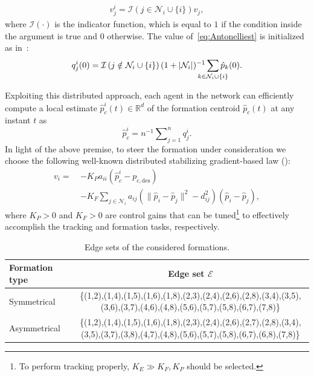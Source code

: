 \documentclass{ifac/ifacconf}
\begin{document}
\begin{align}
    v^i_j = \mathcal{I}\left(j\in \mathcal{N}_i \cup \{i\}\right)v_j,
\end{align}
where $\mathcal{I}(\cdot)$ is the indicator function, which is equal to $1$ if the condition inside the argument is true and $0$ otherwise. The value of~\eqref{eq:Antonelliest} is initialized as in~\cite{FABRIS2024OIFT}:
\begin{align}
    q^i_j(0) = \mathcal{I}\left(j \notin \mathcal{N}_i \cup \{i\}\right)
        (1+|\mathcal{N}_{i}|)^{-1} \sum_{\mathclap{k \in \mathcal{N}_i \cup \{i\}}} \hat{p}_k(0).
\end{align}

Exploiting this distributed approach, each agent in the network can efficiently compute a local estimate $\hat{p}^i_c(t)\in \mathbb{R}^d$ of the formation centroid $\hat{p}_c(t)$ at any instant $t$ as
\begin{equation}
    \hat{p}^i_c = n^{-1} \sum\nolimits_{j=1}^n q^i_j.
\end{equation}
In light of the above premise, to steer the formation under consideration we choose the following well-known distributed stabilizing gradient-based law (\cite{ahn2020formation}):
\begin{align}
    v_i =~ & -K_P a_{ii}(\hat{p}_c^i-p_{c,\text{des}}) \nonumber\\
    & -K_F  \sum_{j\in \mathcal{N}_i}a_{ij} (\|\hat{p}_i-\hat{p}_j\|^2 - d_{ij}^2)(\hat{p}_i-\hat{p}_j),
\end{align}
where $K_P>0$ and $K_F>0$ are control gains that can be tuned\footnote{To perform tracking properly, $K_E \gg K_F,K_P$ should be selected.} to effectively accomplish the tracking and formation tasks, respectively. 


\begin{table}[h]
	\captionsetup{font=small, width=\textwidth}
	\caption{Edge sets of the considered formations.}
	\label{tab:edgesets}
    \scriptsize 
    \centering
	\begin{tabular}{lc}
		\toprule
		Formation type & Edge set $\mathcal{E}$ \\
		\midrule
        Symmetrical & \{(1,2),(1,4),(1,5),(1,6),(1,8),(2,3),(2,4),(2,6),(2,8),(3,4),(3,5),(3,6),(3,7),(4,6),(4,8),(5,6),(5,7),(5,8),(6,7),(7,8)\}\\
        Asymmetrical & \{(1,2),(1,4),(1,5),(1,6),(1,8),(2,3),(2,4),(2,6),(2,7),(2,8),(3,4),(3,5),(3,7),(3,8),(4,7),(4,8),(5,6),(5,7),(5,8),(6,7),(6,8),(7,8)\}\\
		\bottomrule
	\end{tabular}
\end{table}
\end{document}
